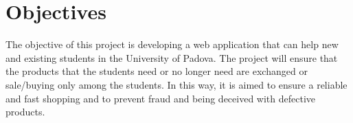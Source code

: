 \section{Objectives}


The objective of this project is developing a web application that can help new and existing students in the University of Padova. The project will ensure that the products that the students need or no longer need are exchanged or sale/buying only among the students. In this way, it is aimed to ensure a reliable and fast shopping and to prevent fraud and being deceived with defective products.
